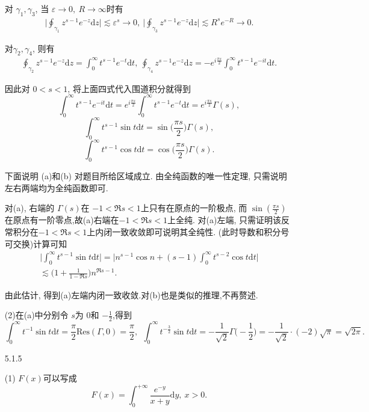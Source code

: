 \begin{itemize}
对 $\gamma_1,\gamma_3$, 当 $\varepsilon\to 0,\ R\to \infty$时有
\begin{align*}
    \bigg|\oint_{\gamma_1}z^{s-1}e^{-z}\mathrm{d}z\bigg|
    \lesssim \varepsilon^{s}\to 0,
    \ \bigg|\oint_{\gamma_3}z^{s-1}e^{-z}\mathrm{d}z\bigg|
    \lesssim R^{s}e^{-R}\to 0.
\end{align*}

对$\gamma_2,\gamma_4$, 则有
\begin{align*}
    \oint_{\gamma_2}z^{s-1}e^{-z}\mathrm{d}z = \int_0^\infty t^{s-1}e^{-t}\mathrm{d}t,
    \ \oint_{\gamma_4}z^{s-1}e^{-z}\mathrm{d}z = -e^{i\frac{\pi s}{2}}\int_0^\infty t^{s-1}e^{-it}\mathrm{d}t.
\end{align*}

因此对 $0<s<1$, 将上面四式代入围道积分就得到
\[\int_0^\infty t^{s-1}e^{-it}\mathrm{d}t = e^{i\frac{\pi s}{2}}\int_0^\infty t^{s-1}e^{-t}\mathrm{d}t 
    = e^{i\frac{\pi s}{2}} \Gamma(s),\]
\[\int_0^\infty t^{s-1}\sin t\mathrm{d}t = \sin\Big( \frac{\pi s}{2}\Big)\Gamma(s),\tag{a}\]
\[\int_0^\infty t^{s-1}\cos t\mathrm{d}t = \cos\Big( \frac{\pi s}{2}\Big)\Gamma(s).\tag{b}\]

下面说明 (a)和(b) 对题目所给区域成立. 
由全纯函数的唯一性定理, 只需说明左右两端均为全纯函数即可.

对(a), 右端的 $\Gamma(s)$在 $-1<\Re s<1$上只有在原点的一阶极点, 
而 $\sin(\frac{\pi s}{2})$在原点有一阶零点,故(a)右端在$-1<\Re s<1$上全纯. 
对(a)左端, 只需证明该反常积分在$-1<\Re s<1$上内闭一致收敛即可说明其全纯性.
(此时导数和积分号可交换)计算可知
\begin{align*}
    \Big|\int_0^\infty t^{s-1}\sin t\mathrm{d}t\Big| 
    = \Big|n^{s-1}\cos n+(s-1)\int_0^\infty t^{s-2}\cos t \mathrm{d}t\Big|\\
    \lesssim \Big(1+\frac{1}{1-\Re s}\Big)  n^{\Re s-1}.
\end{align*}

由此估计, 得到(a)左端内闭一致收敛.对(b)也是类似的推理,不再赘述.

(2)在(a)中分别令 $s$为 $0$和 $-\frac{1}{2}$,得到
$$\int_0^\infty t^{-1}\sin t \mathrm{d}t  
= \frac{\pi}{2}\text{Res}(\Gamma,0) = \frac{\pi}{2},
\ \ \int_0^\infty t^{-\frac{3}{2}}\sin t \mathrm{d}t  
= -\frac{1}{\sqrt{2}}\Gamma\Big(-\frac{1}{2}\Big) 
= -\frac{1}{\sqrt{2}}\cdot (-2) \sqrt{\pi} = \sqrt{2 \pi}.$$

\item[5.1.5]

(1) $F(x)$可以写成
$$F(x) = \int_{0}^{+\infty}\frac{e^{-y}}{x+y}\mathrm{d}y,\ x>0.$$


\end{itemize}

